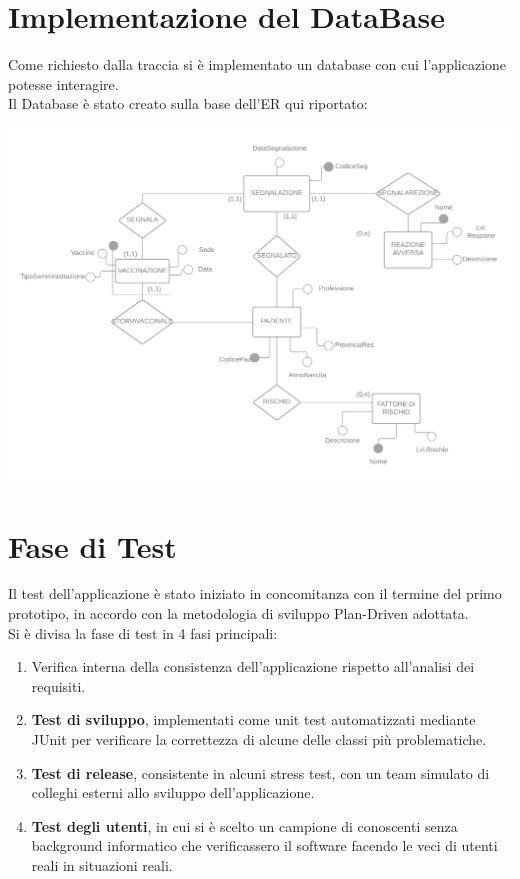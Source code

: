 \documentclass[11pt]{article}
\begin{document}
\newpage
    \section{Implementazione del DataBase}
    Come richiesto dalla traccia si è implementato un database con cui l'applicazione potesse interagire.\\
    Il Database è stato creato sulla base dell'ER qui riportato:
        \begin{center}
            \includegraphics[width=1\textwidth]{pictures/_Diagramma vuoto.png}
        \end{center}

\newpage
    \section{Fase di Test}
    Il test dell'applicazione è stato iniziato in concomitanza con il termine del primo prototipo, in accordo con la metodologia di sviluppo Plan-Driven adottata.\\
    Si è divisa la fase di test in 4 fasi principali:
        \begin{enumerate}
            \item Verifica interna della consistenza dell'applicazione rispetto all'analisi dei requisiti.
            \item \textbf{Test di sviluppo}, implementati come unit test automatizzati mediante JUnit per verificare la correttezza di
            alcune delle classi più problematiche.
            \item \textbf{Test di release}, consistente in alcuni stress test, con un team simulato di colleghi esterni allo sviluppo dell'applicazione.
            \item \textbf{Test degli utenti}, in cui si è scelto un campione di conoscenti senza background informatico che verificassero il software facendo le veci di utenti reali in situazioni reali.
        \end{enumerate}
    
\end{document}
